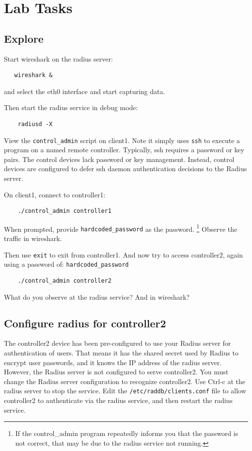 \section{Lab Tasks}
\subsection{Explore}
Start wireshark on the radius server:
\begin{verbatim}
   wireshark &
\end{verbatim}
\noindent and select the eth0 interface and start capturing data.

Then start the radius service in debug mode:
\begin{verbatim}
    radiusd -X
\end{verbatim}

View the {\tt control\_admin} script on client1.  Note it simply uses {\tt ssh} to execute a program
on a named remote controller.  Typically, ssh requires a password or key pairs.  The control devices
lack password or key management.  Instead, control devices are configured to defer ssh daemon authentication decisions to
the Radius server.

On client1, connect to controller1:
\begin{verbatim}
    ./control_admin controller1
\end{verbatim}
\noindent When prompted, provide {\tt hardcoded\_password} as the password.
\footnote{If the control\_admin program
repeatedly informs you that the password is not correct, that may be
due to the radius service not running.}
Observe the traffic in wireshark. 

Then use {\tt exit} to exit from controller1.  And now try to access
controller2, again using a password of: {\tt hardcoded\_password}
\begin{verbatim}
    ./control_admin controller2
\end{verbatim}
\noindent What do you observe at the radius service?  And in wireshark?

\subsection{Configure radius for controller2}
The controller2 device has been pre-configured to use your Radius server for 
authentication of users.  That means it has the shared secret used by Radius
to encrypt user passwords, and it knows the IP address of the radius server.
However, the Radius server is not configured to serve controller2.  You must
change the Radius server configuration to recognize controller2.
Use Ctrl-c at the radius server to stop the service.
Edit the {\tt /etc/raddb/clients.conf} file to allow controller2 to authenticate
via the radius service, and then restart the radius service.

